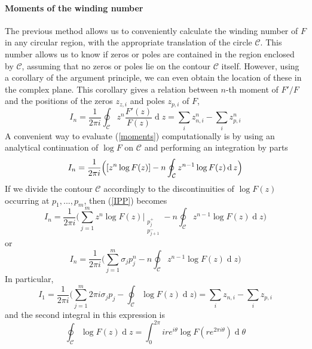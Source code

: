 \documentclass[11pt]{report}
\numberwithin{equation}{section}
\begin{document}
\paragraph{Moments of the winding number}
The previous method allows us to conveniently calculate the winding number of $F$ in any circular region, with the appropriate translation of the circle $\mathcal{C}$. This number allows us to know if zeros or poles are contained in the region enclosed by $\mathcal{C}$, assuming that no zeros or poles lie on the contour $\mathcal{C}$ itself. However, using a corollary of the argument principle, we can even obtain the location of these in the complex plane. This corollary gives a relation between $n$-th moment of $F'/F$ and the positions of the zeros $z_{z,i}$ and poles $z_{p,i}$ of $F$,
%
\begin{equation} \label{moments}
    I_n =     \frac{1}{2 \pi i}\oint_{\mathcal{C}} z^n \frac{F'(z)}{F(z)} \operatorname{d}z = \sum_i z_{n,i}^{n} - \sum_i z_{p,i}^{n} 
\end{equation}
%
A convenient way to evaluate (\ref{moments}) computationally is by using an analytical continuation of $\log F$ on $\mathcal{C}$ and performing an integration by parts
%
\begin{equation} {\label{IPP}}
     I_n = \frac{1}{2 \pi i} \Big( [z^n \log F(z) ]  - n \oint_\mathcal{C} z^{n-1} \log F(z) \operatorname{d}z \Big)
\end{equation}
%
If we divide the contour $\mathcal{C}$ accordingly to the discontinuities of $\log F(z)$ occurring at $p_1,..., p_m$, then (\ref{IPP}) becomes
%
\begin{equation}
    I_n = \frac{1}{2 \pi i} \Big( \sum_{j=1}^m z^n \log F(z) \Bigr|_{{\substack{p_j^{+}\\p_{j+1}^{-}}}}  - n \oint_\mathcal{C} z^{n-1} \log F(z) \operatorname{d}z \Big)
\end{equation}
%
or
%
\begin{equation}
    I_n = \frac{1}{2 \pi i} \Big( \sum_{j=1}^m \sigma_j p_j^n  - n \oint_\mathcal{C} z^{n-1} \log F(z) \operatorname{d}z \Big)
\end{equation}
%
In particular,
%
\begin{equation}
    I_1 = \frac{1}{2 \pi i} \Big( \sum_{j=1}^m 2 \pi i \sigma_j p_j  -  \oint_\mathcal{C} \log F(z) \operatorname{d}z \Big) = \sum_i z_{n,i} - \sum_i z_{p,i}
\end{equation}
%
and the second integral in this expression is
%
\begin{equation}
	\oint_\mathcal{C} \log F(z) \operatorname{d}z = 
	\int_0^{2\pi} i r e^{i\theta} \log F(r e^{2\pi i\theta}) \operatorname{d}\theta
\end{equation}
\end{document}

